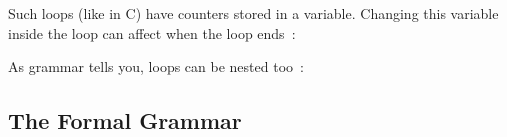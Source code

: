 

Such loops (like in C) have counters stored in a variable. Changing this variable inside the loop can affect when the loop ends~:




As grammar tells you, loops can be nested too~:




\subsection*{The Formal Grammar}


